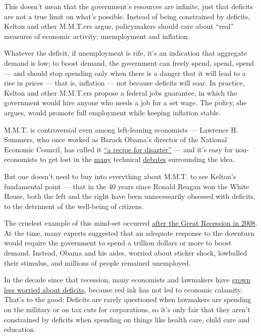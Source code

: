 This doesn't mean that the government's resources are infinite, just
that deficits are not a true limit on what's possible. Instead of being
constrained by deficits, Kelton and other M.M.T.ers argue, policymakers
should care about ``real'' measures of economic activity: unemployment
and inflation.

Whatever the deficit, if unemployment is rife, it's an indication that
aggregate demand is low; to boost demand, the government can freely
spend, spend, spend --- and should stop spending only when there is a
danger that it will lead to a rise in prices --- that is, inflation ---
not because deficits will soar. In practice, Kelton and other M.M.T.ers
propose a federal jobs guarantee, in which the government would hire
anyone who needs a job for a set wage. The policy, she argues, would
promote full employment while keeping inflation stable.

M.M.T. is controversial even among left-leaning economists --- Lawrence
H. Summers, who once worked as Barack Obama's director of the National
Economic Council, has called it
\href{https://www.washingtonpost.com/opinions/the-lefts-embrace-of-modern-monetary-theory-is-a-recipe-for-disaster/2019/03/04/6ad88eec-3ea4-11e9-9361-301ffb5bd5e6_story.html}{``a
recipe for disaster''} --- and it's easy for non-economists to get lost
in the
\href{https://crookedtimber.org/2020/06/01/modern-monetary-theory-neither-modern-nor-monetary-nor-mainly-theoretical/}{many}
technical
\href{https://www.bradford-delong.com/2019/03/james-montier-wonders-why-people-hate-mmt-he-is-about-to-discover-that-mmt-hates-him.html}{debates}
surrounding the idea.

But one doesn't need to buy into everything about M.M.T. to see Kelton's
fundamental point --- that in the 40 years since Ronald Reagan won the
White House, both the left and the right have been unnecessarily
obsessed with deficits, to the detriment of the well-being of citizens.

The cruelest example of this mind-set occurred
\href{https://www.nytimes3xbfgragh.onion/2019/09/18/opinion/obama-2008-financial-crisis.html}{after
the Great Recession in 2008}. At the time, many experts suggested that
an adequate response to the downturn would require the government to
spend a trillion dollars or more to boost demand. Instead, Obama and his
aides, worried about sticker shock, lowballed their stimulus, and
millions of people remained unemployed.

In the decade since that recession, many economists and lawmakers have
\href{https://www.nytimes3xbfgragh.onion/2020/05/16/business/deficits-virus-economists-trump.html}{grown
less worried about deficits}, because red ink has not led to economic
calamity. That's to the good: Deficits are rarely questioned when
lawmakers are spending on the military or on tax cuts for corporations,
so it's only fair that they aren't constrained by deficits when spending
on things like health care, child care and education.

